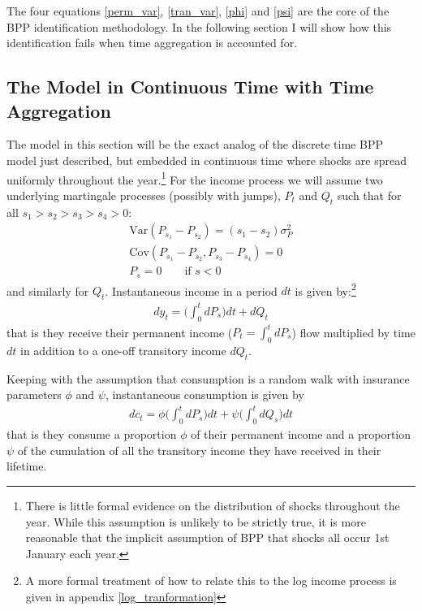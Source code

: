 The four equations \ref{perm_var}, \ref{tran_var}, \ref{phi} and \ref{psi} are the core of the BPP identification methodology. In the following section I will show how this identification fails when time aggregation is accounted for.

\subsection{The Model in Continuous Time with Time Aggregation}
The model in this section will be the exact analog of the discrete time BPP model just described, but embedded in continuous time where shocks are spread uniformly throughout the year.\footnote{There is little formal evidence on the distribution of shocks throughout the year. While this assumption is unlikely to be strictly true, it is more reasonable that the implicit assumption of BPP that shocks all occur 1st January each year.} For the income process we will assume two underlying martingale processes (possibly with jumps), $P_t$ and $Q_t$ such that for all $s_1>s_2>s_3>s_4>0$:
\begin{align*}
\mathrm{Var}(P_{s_1}-P_{s_2})=(s_1-s_2)\sigma_P^2 \\
\mathrm{Cov}(P_{s_1}-P_{s_2},P_{s_3}-P_{s_4}) = 0 \\
P_s = 0 \qquad \text{if } s<0
\end{align*}
and similarly for $Q_t$.  Instantaneous income in a period $dt$ is given by:\footnote{A more formal treatment of how to relate this to the log income process is given in appendix \ref{log_tranformation}}
\begin{align}
dy_t = \Big( \int_{0}^{t}dP_s \Big) dt  +dQ_t \label{income_process}
\end{align}
that is they receive their permanent income ($P_t =\int_{0}^{t}dP_s $) flow multiplied by time $dt$ in addition to a one-off transitory income $dQ_t$.

Keeping with the assumption that consumption is a random walk with insurance parameters $\phi$ and $\psi$, instantaneous consumption is given by
\begin{align}
dc_t = \phi \Big( \int_{0}^{t} dP_s  \Big) dt +\psi\Big( \int_{0}^{t}dQ_s\Big) dt  \label{consumption_process}
\end{align}
that is they consume a proportion $\phi$ of their permanent income and a proportion $\psi$ of the cumulation of all the transitory income they have received in their lifetime.

